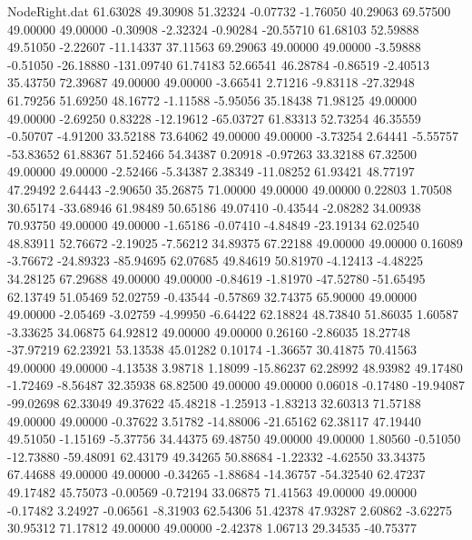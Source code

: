 \begin{filecontents}{NodeRight.dat}
  61.63028   49.30908   51.32324    -0.07732   -1.76050   40.29063   69.57500   49.00000   49.00000   -0.30908   -2.32324   -0.90284  -20.55710
  61.68103   52.59888   49.51050    -2.22607  -11.14337   37.11563   69.29063   49.00000   49.00000   -3.59888   -0.51050  -26.18880 -131.09740
  61.74183   52.66541   46.28784    -0.86519   -2.40513   35.43750   72.39687   49.00000   49.00000   -3.66541    2.71216   -9.83118  -27.32948
  61.79256   51.69250   48.16772    -1.11588   -5.95056   35.18438   71.98125   49.00000   49.00000   -2.69250    0.83228  -12.19612  -65.03727
  61.83313   52.73254   46.35559    -0.50707   -4.91200   33.52188   73.64062   49.00000   49.00000   -3.73254    2.64441   -5.55757  -53.83652
  61.88367   51.52466   54.34387     0.20918   -0.97263   33.32188   67.32500   49.00000   49.00000   -2.52466   -5.34387    2.38349  -11.08252
  61.93421   48.77197   47.29492     2.64443   -2.90650   35.26875   71.00000   49.00000   49.00000    0.22803    1.70508   30.65174  -33.68946
  61.98489   50.65186   49.07410    -0.43544   -2.08282   34.00938   70.93750   49.00000   49.00000   -1.65186   -0.07410   -4.84849  -23.19134
  62.02540   48.83911   52.76672    -2.19025   -7.56212   34.89375   67.22188   49.00000   49.00000    0.16089   -3.76672  -24.89323  -85.94695
  62.07685   49.84619   50.81970    -4.12413   -4.48225   34.28125   67.29688   49.00000   49.00000   -0.84619   -1.81970  -47.52780  -51.65495
  62.13749   51.05469   52.02759    -0.43544   -0.57869   32.74375   65.90000   49.00000   49.00000   -2.05469   -3.02759   -4.99950   -6.64422
  62.18824   48.73840   51.86035     1.60587   -3.33625   34.06875   64.92812   49.00000   49.00000    0.26160   -2.86035   18.27748  -37.97219
  62.23921   53.13538   45.01282     0.10174   -1.36657   30.41875   70.41563   49.00000   49.00000   -4.13538    3.98718    1.18099  -15.86237
  62.28992   48.93982   49.17480    -1.72469   -8.56487   32.35938   68.82500   49.00000   49.00000    0.06018   -0.17480  -19.94087  -99.02698
  62.33049   49.37622   45.48218    -1.25913   -1.83213   32.60313   71.57188   49.00000   49.00000   -0.37622    3.51782  -14.88006  -21.65162
  62.38117   47.19440   49.51050    -1.15169   -5.37756   34.44375   69.48750   49.00000   49.00000    1.80560   -0.51050  -12.73880  -59.48091
  62.43179   49.34265   50.88684    -1.22332   -4.62550   33.34375   67.44688   49.00000   49.00000   -0.34265   -1.88684  -14.36757  -54.32540
  62.47237   49.17482   45.75073    -0.00569   -0.72194   33.06875   71.41563   49.00000   49.00000   -0.17482    3.24927   -0.06561   -8.31903
  62.54306   51.42378   47.93287     2.60862   -3.62275   30.95312   71.17812   49.00000   49.00000   -2.42378    1.06713   29.34535  -40.75377

\end{filecontents}
